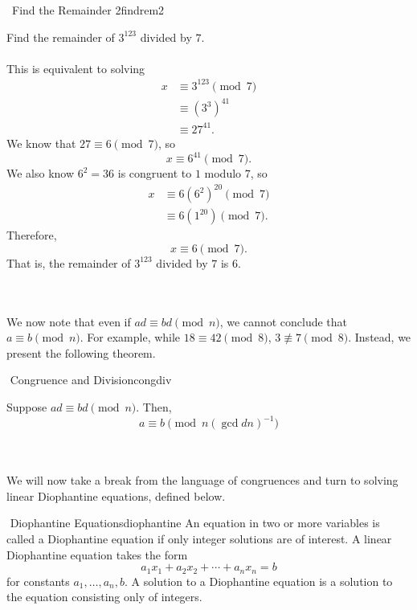     \begin{exercise}{\Difficulty\,\Difficulty\,\,Find the Remainder 2}{findrem2}
    
        Find the remainder of \(3^{123}\) divided by \(7\). 
        \\
        \\
        This is equivalent to solving
        \begin{align*}
            x&\equiv3^{123}\pmod7\\
            &\equiv (3^3)^{41} \\
            &\equiv 27^{41}.
        \end{align*}
        We know that \(27\equiv 6\pmod7\), so 
        \begin{equation*}
            x\equiv6^{41}\pmod 7.
        \end{equation*}
        We also know \(6^2=36\) is congruent to \(1\) modulo \(7\), so
        \begin{align*}
            x&\equiv6(6^2)^{20}\pmod7 \\
            &\equiv 6(1^{20})\pmod 7.
        \end{align*}
        Therefore, 
        \begin{equation*}
            x\equiv 6\pmod7.
        \end{equation*}
        That is, the remainder of \(3^{123}\) divided by \(7\) is \(6\).
    
    \end{exercise}
    \pagebreak
    \vphantom
    \\
    \\
    We now note that even if \(ad\equiv bd\pmod n\), we cannot conclude that \(a\equiv b\pmod n\). For example, while \(18\equiv42\pmod8\), \(3\nequiv7\pmod8\). Instead, we present the following theorem.
    \begin{theorem}{\Stop\,\,Congruence and Division}{congdiv}
    
        Suppose \(ad\equiv bd \pmod n\). Then,
        \begin{equation*}
            a\equiv b\pmod{n(\gcd{d}{n})^{-1}}
        \end{equation*}
    
    \end{theorem}
    \vphantom
    \\
    \\
    We will now take a break from the language of congruences and turn to solving linear Diophantine equations, defined below.
    \begin{definition}{\Stop\,\,Diophantine Equations}{diophantine}
        An equation in two or more variables is called a Diophantine equation if only integer solutions are of interest. A linear Diophantine equation takes the form
        \begin{equation*}
            a_1x_1+a_2x_2+\cdots+a_nx_n=b
        \end{equation*}
        for constants \(a_1,\ldots,a_n,b\). A solution to a Diophantine equation is a solution to the equation consisting only of integers.
    \end{definition}
